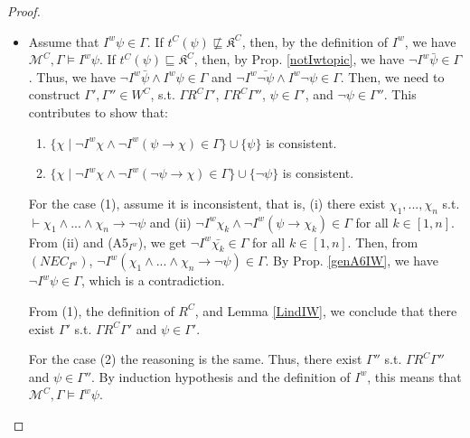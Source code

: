 \documentclass{article}
\begin{document}
\begin{proof}
\begin{itemize}
\item[($\Leftarrow$)] Assume that $I^{w} \psi \in \Gamma$. If $t^{C}(\psi) \not \sqsubseteq \mathfrak{K}^{C}$, then, by the definition of $I^{w}$, we have $\mathcal{M}^{C}, \Gamma \models I^{w}\psi$. If $t^{C}(\psi) \sqsubseteq \mathfrak{K}^{C}$, then, by Prop. \ref{notIwtopic}, we have $\neg I^{w} \bar{\psi} \in \Gamma$. Thus, we have $\neg I^{w} \bar{\psi} \wedge I^{w} \psi \in \Gamma$ and $\neg I^{w} \bar{\neg \psi} \wedge I^{w} \neg \psi \in \Gamma$. Then, we need to construct $\Gamma' , \Gamma'' \in W^{C}$, s.t. $\Gamma R^{C} \Gamma'$, $\Gamma R^{C} \Gamma''$, $\psi \in \Gamma'$, and $\neg \psi \in \Gamma''$. This contributes to show that:

\begin{enumerate}

\item[(1)] $\{\chi \mid \neg I^{w} \chi \wedge \neg I^{w}(\psi \rightarrow \chi) \in \Gamma\} \cup \{\psi\}$ is consistent. 

\item[(2)] $\{\chi \mid\neg I^{w} \chi \wedge \neg I^{w}(\neg \psi \rightarrow \chi) \in \Gamma\} \cup \{\neg \psi\}$ is consistent. 

\end{enumerate}

For the case (1), assume it is inconsistent, that is, (i) there exist $\chi_{1}, ..., \chi_{n}$ s.t. $\vdash \chi_{1} \wedge ... \wedge \chi_{n} \rightarrow \neg \psi$ and (ii) $\neg I^{w} \chi_{k} \wedge \neg I^{w}(\psi \rightarrow \chi_{k}) \in \Gamma$ for all $k \in [1, n]$. From (ii) and (A5$_{I^{w}}$), we get $\neg I^{w} \bar{\chi_{k}} \in \Gamma$ for all $k \in [1, n]$. Then, from $(NEC_{I^{w}})$, $\neg I^{w}(\chi_{1} \wedge ... \wedge \chi_{n} \rightarrow \neg \psi) \in \Gamma$. By Prop. \ref{genA6IW}, we have $\neg I^{w} \psi \in \Gamma$, which is a contradiction.




From (1), the definition of $R^{C}$, and Lemma \ref{LindIW}, we conclude that there exist $\Gamma'$ s.t. $\Gamma R^{C} \Gamma'$ and $\psi \in \Gamma'$.

For the case (2) the reasoning is the same. 
Thus, there exist $\Gamma''$ s.t. $\Gamma R^{C} \Gamma''$ and $\psi \in \Gamma''$. By induction hypothesis and the definition of $I^{w}$, this means that $\mathcal{M}^{C}, \Gamma \models I^{w} \psi$.


\end{itemize}

\end{proof}
\end{document}
